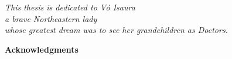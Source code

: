 \newpage
\thispagestyle{empty}

 \parbox{5.4in}{
  \begin{center}
   \begin{flushright}
    \textit{This thesis is dedicated to Vó Isaura \\ a brave Northeastern lady \\ whose greatest dream was to see her grandchildren as Doctors.}
   \end{flushright}
  \end{center}
 }

\frontmatter
\newpage







\newpage

\bigskip
\bigskip
\begin{center}
{\Large{\bf Acknowledgments}}
\end{center}
\vspace{1cm}

